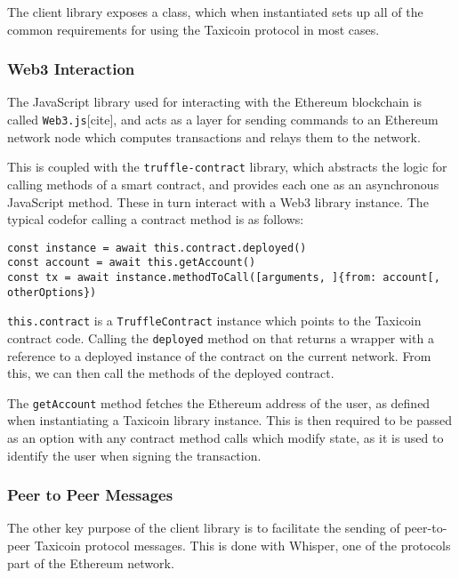 The client library exposes a class, which when instantiated sets up all of the common requirements for using the Taxicoin protocol in most cases.

\subsubsection{Web3 Interaction}

The JavaScript library used for interacting with the Ethereum blockchain is called \lstinline{Web3.js}[cite], and acts as a layer for sending commands to an Ethereum network node which computes transactions and relays them to the network.

This is coupled with the \lstinline{truffle-contract} library, which abstracts the logic for calling methods of a smart contract, and provides each one as an asynchronous JavaScript method. These in turn interact with a Web3 library instance. The typical code\footnotemark for calling a contract method is as follows:


\begin{lstlisting}
const instance = await this.contract.deployed()
const account = await this.getAccount()
const tx = await instance.methodToCall([arguments, ]{from: account[, otherOptions})
\end{lstlisting}

\lstinline{this.contract} is a \lstinline{TruffleContract} instance which points to the Taxicoin contract code. Calling the \lstinline{deployed} method on that returns a wrapper with a reference to a deployed instance of the contract on the current network. From this, we can then call the methods of the deployed contract.

The \lstinline{getAccount} method fetches the Ethereum address of the user, as defined when instantiating a Taxicoin library instance. This is then required to be passed as an option with any contract method calls which modify state, as it is used to identify the user when signing the transaction.

\subsubsection{Peer to Peer Messages}

The other key purpose of the client library is to facilitate the sending of peer-to-peer Taxicoin protocol messages. This is done with Whisper, one of the protocols part of the Ethereum network.

